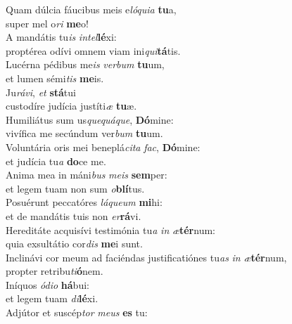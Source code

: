 \oddverse Quam dúlcia fáucibus meis e\textit{ló}\textit{qui}\textit{a} \textbf{tu}a,~\*\\
\oddverse super mel o\textit{ri} \textbf{me}o!\\
\evenverse A mandátis tu\textit{is} \textit{in}\textit{tel}\textbf{lé}xi:~\*\\
\evenverse proptérea odívi omnem viam ini\textit{qui}\textbf{tá}tis.\\
\oddverse Lucérna pédibus me\textit{is} \textit{ver}\textit{bum} \textbf{tu}um,~\*\\
\oddverse et lumen sémi\textit{tis} \textbf{me}is.\\
\evenverse Ju\textit{rá}\textit{vi}, \textit{et} \textbf{stá}tui~\*\\
\evenverse custodíre judícia justíti\textit{æ} \textbf{tu}æ.\\
\oddverse Humiliátus sum us\textit{que}\textit{quá}\textit{que}, \textbf{Dó}mine:~\*\\
\oddverse vivífica me secúndum ver\textit{bum} \textbf{tu}um.\\
\evenverse Voluntária oris mei beneplá\textit{ci}\textit{ta} \textit{fac}, \textbf{Dó}mine:~\*\\
\evenverse et judícia tu\textit{a} \textbf{do}ce me.\\
\oddverse Anima mea in máni\textit{bus} \textit{me}\textit{is} \textbf{sem}per:~\*\\
\oddverse et legem tuam non sum \textit{o}\textbf{blí}tus.\\
\evenverse Posuérunt peccatóres \textit{lá}\textit{que}\textit{um} \textbf{mi}hi:~\*\\
\evenverse et de mandátis tuis non \textit{er}\textbf{rá}vi.\\
\oddverse Hereditáte acquisívi testimónia tu\textit{a} \textit{in} \textit{æ}\textbf{tér}num:~\*\\
\oddverse quia exsultátio cor\textit{dis} \textbf{me}i sunt.\\
\evenverse Inclinávi cor meum ad faciéndas justificatiónes tu\textit{as} \textit{in} \textit{æ}\textbf{tér}num,~\*\\
\evenverse propter retribu\textit{ti}\textbf{ó}nem.\\
\oddverse Iníquos \textit{ó}\textit{di}\textit{o} \textbf{há}bui:~\*\\
\oddverse et legem tuam \textit{di}\textbf{lé}xi.\\
\evenverse Adjútor et suscép\textit{tor} \textit{me}\textit{us} \textbf{es} tu:~\*\\
